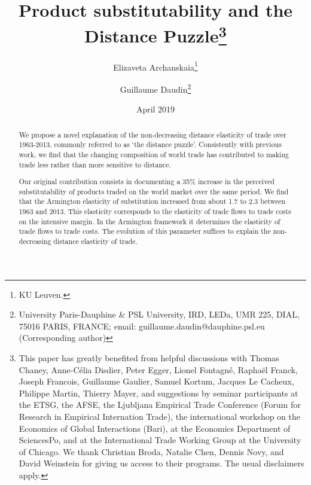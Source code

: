 \documentclass[12pt,twoside,a4paper,notitlepage]{article}
\begin{document}
\linespread{1}
\author{Elizaveta Archanskaia\thanks{KU Leuven.}\and Guillaume Daudin\thanks{University Paris-Dauphine \& PSL University, IRD, LEDa, UMR 225, DIAL, 75016 PARIS, FRANCE; email: guillaume.daudin@dauphine.psl.eu (Corresponding author)}}

\title{Product substitutability and the Distance Puzzle\thanks{This paper has greatly benefited from helpful discussions with Thomas Chaney, Anne-C\'elia Disdier, Peter Egger, Lionel Fontagn\'e, Raphaël Franck, Joseph Francois, Guillaume Gaulier, Samuel Kortum, Jacques Le Cacheux, Philippe Martin, Thierry Mayer, and suggestions by seminar participants at the ETSG, the AFSE, the Ljubljana Empirical Trade Conference (Forum for Research in Empirical Internation Trade), the international workshop on the Economics of Global Interactions (Bari), at the Economics Department of SciencesPo, and at the International Trade Working Group at the University of Chicago.
We thank Christian Broda, Natalie Chen, Dennis Novy, and David Weinstein for giving us access to their programs.
The usual disclaimers apply.}}
\date{April 2019
\\
}

\maketitle
\begin{abstract}
We propose a novel explanation of the non-decreasing distance elasticity of trade over 1963-2013, commonly referred to as `the distance puzzle'.
Consistently with previous work, we find that the changing composition of world trade has contributed to making trade less rather than more sensitive to distance.

Our original contribution consists in documenting a 35\% increase in the perceived substitutability of products traded on the world market over the same period.
We find that the Armington elasticity of substitution increased from about 1.7 to 2.3 between 1963 and 2013.
This elasticity corresponds to the elasticity of trade flows to trade costs on the intensive margin.
In the Armington framework it determines the elasticity of trade flows to trade costs.
The evolution of this parameter suffices to explain the non-decreasing distance elasticity of trade.

\end{abstract}
\end{document}
